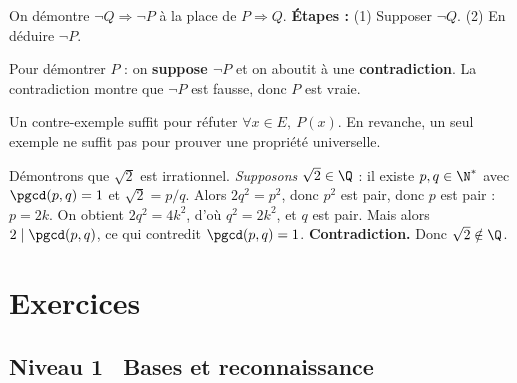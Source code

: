 \begin{methode}
On d\'emontre $\lnot Q \Rightarrow \lnot P$ \`a la place de $P \Rightarrow Q$.
\textbf{\'Etapes :} (1) Supposer $\lnot Q$. (2) En d\'eduire $\lnot P$.
\end{methode}

\begin{methode}
Pour d\'emontrer $P$ :
on \textbf{suppose $\lnot P$} et on aboutit \`a une \textbf{contradiction}.
La contradiction montre que $\lnot P$ est fausse, donc $P$ est vraie.
\end{methode}

\begin{attention}
Un contre-exemple suffit pour r\'efuter $\forall x \in E,\ P(x)$.
En revanche, un seul exemple ne suffit pas pour prouver une propri\'et\'e
universelle.
\end{attention}

\begin{ex}
D\'emontrons que $\sqrt{2}$ est irrationnel.
\emph{Supposons} $\sqrt{2} \in \Q$ : il existe $p, q \in \N^*$ avec $\pgcd(p,q)=1$
et $\sqrt{2} = p/q$.
Alors $2q^2 = p^2$, donc $p^2$ est pair, donc $p$ est pair : $p = 2k$.
On obtient $2q^2 = 4k^2$, d'o\`u $q^2 = 2k^2$, et $q$ est pair.
Mais alors $2 \mid \pgcd(p,q)$, ce qui contredit $\pgcd(p,q)=1$. \textbf{Contradiction.}
Donc $\sqrt{2} \notin \Q$.
\end{ex}

\section{Exercices}

\subsection*{\quad Niveau 1 \textemdash\ Bases et reconnaissance}

